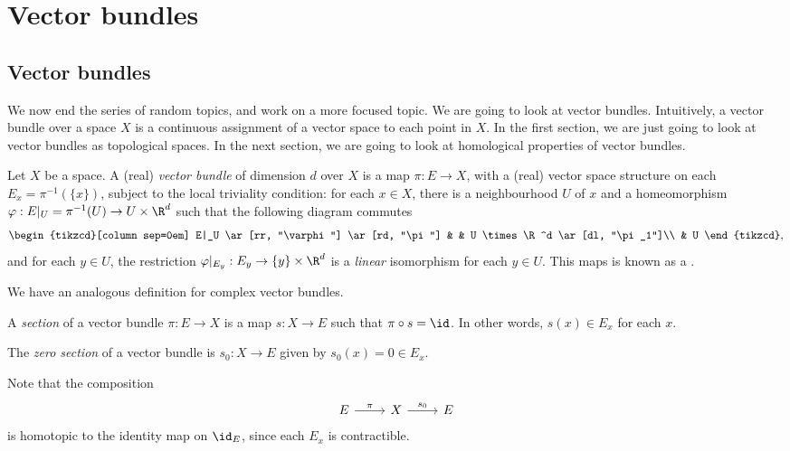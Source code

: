 \documentclass[a4paper]{article}
\begin{document}
\section{Vector bundles}
\subsection{Vector bundles}
We now end the series of random topics, and work on a more focused topic. We are going to look at vector bundles. Intuitively, a vector bundle over a space $X$ is a continuous assignment of a vector space to each point in $X$. In the first section, we are just going to look at vector bundles as topological spaces. In the next section, we are going to look at homological properties of vector bundles.

\begin{defi}
  Let $X$ be a space. A (real) \emph{vector bundle} of dimension $d$ over $X$ is a map $\pi:E \to X$, with a (real) vector space structure on each  $E_x = \pi^{-1}(\{x\})$, subject to the local triviality condition: for each $x \in X$, there is a neighbourhood $U$ of $x$ and a homeomorphism $\varphi:E|_U = \pi^{-1}(U) \to U \times \R^d$ such that the following diagram commutes
  \[
    \begin{tikzcd}[column sep=0em]
      E|_U \ar[rr, "\varphi"] \ar[rd, "\pi"] & & U \times \R^d \ar[dl, "\pi_1"]\\
      & U
    \end{tikzcd},
  \]
  and for each $y \in U$, the restriction $\varphi|_{E_y}: E_y \to \{y\} \times \R^d$ is a \emph{linear} isomorphism for each $y \in U$. This maps is known as a .
\end{defi}
We have an analogous definition for complex vector bundles.

\begin{defi}[Section]
  A \emph{section} of a vector bundle $\pi: E \to X$ is a map $s: X \to E$ such that $\pi \circ s = \id$. In other words, $s(x) \in E_x$ for each $x$.
\end{defi}

\begin{defi}
  The \emph{zero section} of a vector bundle is $s_0: X \to E$ given by $s_0(x) = 0 \in E_x$.
\end{defi}

Note that the composition
\[
  \begin{tikzcd}
    E \ar[r, "\pi"] & X \ar[r, "s_0"] & E
  \end{tikzcd}
\]
is homotopic to the identity map on $\id_E$, since each $E_x$ is contractible.
\end{document}
